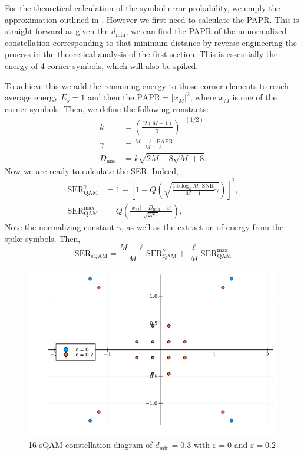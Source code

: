\documentclass[11pt,a4paper,onecolumn,final]{article}
\newcommand{\dmin}{d_\text{min}}
\newcommand{\eps}{\varepsilon}
\begin{document}
For the theoretical calculation of the symbol error probability, we emply the approximation outlined in \cite{sqam}. However we first need to calculate the PAPR. This is straight-forward as given the \(\dmin\), we can find the PAPR of the unnormalized constellation corresponding to that minimum distance by reverse engineering the process in the theoretical analysis of the first section. This is essentially the energy of 4 corner symbols, which will also be spiked. 

To achieve this we add the remaining energy to those corner elements to reach average energy \(E_s = 1\) and then the \(\text{PAPR} = |x_M|^2\), where \(x_M\) is one of the corner symbols. Then, we define the following constants: 
\begin{align}
    k &= \left(\frac{(2(M - 1)}{3}\right)^{-(1/2)} \\
    \gamma &= \frac{M - \ell \cdot \text{PAPR}}{M - \ell} \\
    D_\text{mid} &= k\sqrt{2M - 8\sqrt{M} + 8}. 
\end{align}
Now we are ready to calculate the SER. Indeed, 
\begin{align}
    \text{SER}_\text{QAM}^\gamma &= 1 - \left[1 - Q\left(\sqrt{\frac{1.5\log_2 M \cdot \text{SNR}}{M - 1}\gamma}\right)\right]^2, \\
    \text{SER}_\text{QAM}^\text{max} &= Q\left(\frac{|x_M| - D_\text{mid} - \eps '}{\sqrt{2N_0}}\right),
\end{align}
Note the normalizing constant \(\gamma \), as well as the extraction of energy from the spike symbols. Then, 
\begin{equation}
    \text{SER}_\text{sQAM} = \frac{M - \ell}{M }\text{SER}_\text{QAM}^\gamma + \frac{\ell }{M }\text{SER}_\text{QAM}^\text{max}
\end{equation}
\begin{figure}[h]
    \centering
    \includegraphics[scale=0.6]{16sqam_both0and02.png}
    \caption{16-sQAM constellation diagram of \(\dmin = 0.3\) with \(\eps = 0\) and \(\eps = 0.2\)}
\end{figure}
\end{document}
